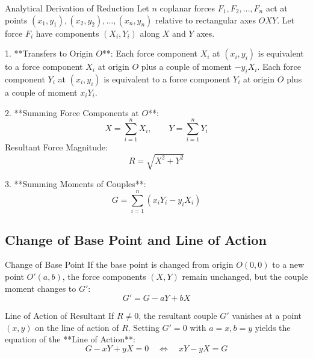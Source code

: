 \documentclass[11pt,a4paper]{article}
\begin{document}
\begin{proofbox}{Analytical Derivation of Reduction}
Let $n$ coplanar forces $F_1, F_2, \dots, F_n$ act at points $(x_1, y_1), (x_2, y_2), \dots, (x_n, y_n)$ relative to rectangular axes $OXY$.
Let force $F_i$ have components $(X_i, Y_i)$ along $X$ and $Y$ axes.

1. **Transfers to Origin $O$**: Each force component $X_i$ at $(x_i, y_i)$ is equivalent to a force component $X_i$ at origin $O$ plus a couple of moment $-y_i X_i$.
   Each force component $Y_i$ at $(x_i, y_i)$ is equivalent to a force component $Y_i$ at origin $O$ plus a couple of moment $x_i Y_i$.

2. **Summing Force Components at $O$**:
   \begin{equation}
   X = \sum_{i=1}^n X_i, \qquad Y = \sum_{i=1}^n Y_i
   \end{equation}
   Resultant Force Magnitude:
   \begin{equation}
   R = \sqrt{X^2 + Y^2}
   \end{equation}

3. **Summing Moments of Couples**:
   \begin{equation}
   G = \sum_{i=1}^n (x_i Y_i - y_i X_i)
   \end{equation}
\end{proofbox}

\subsection{Change of Base Point and Line of Action}

\begin{proofbox}{Change of Base Point}
If the base point is changed from origin $O(0,0)$ to a new point $O'(a, b)$, the force components $(X, Y)$ remain unchanged, but the couple moment changes to $G'$:
\begin{equation}
G' = G - aY + bX
\end{equation}
\end{proofbox}

\begin{theorembox}{Line of Action of Resultant}
If $R \neq 0$, the resultant couple $G'$ vanishes at a point $(x, y)$ on the line of action of $R$.
Setting $G' = 0$ with $a = x, b = y$ yields the equation of the **Line of Action**:
\begin{equation}
G - xY + yX = 0 \quad \iff \quad xY - yX = G
\end{equation}
\end{theorembox}
\end{document}

